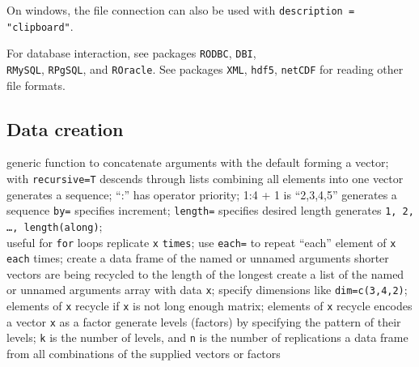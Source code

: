 On windows, the file connection can also be used with {\tt description =
"clipboard"}.


For database interaction, see packages {\tt RODBC}, {\tt DBI},\\
{\tt RMySQL}, {\tt RPgSQL}, and {\tt ROracle}. See packages {\tt XML},
{\tt hdf5}, {\tt netCDF} for reading other file formats.

\subsection{Data creation}{}
	{generic function to concatenate arguments with the default
forming a vector; with {\tt recursive=T} descends through lists combining all
elements into one vector}
	{generates a sequence; ``:'' has operator priority; 1:4 + 1 is
``2,3,4,5''}
	{generates a sequence {\tt by=} specifies increment; {\tt length=} specifies desired length}
	{generates {\tt 1, 2, \ldots, length(along)};\\useful for
{\tt for} loops}
	{replicate {\tt x} {\tt times}; use {\tt each=} to repeat ``each'' element of {\tt x} {\tt each} times;}
	{create a data frame of the named or unnamed arguments}
	{shorter vectors are being recycled to the length of the longest}
	{create a list of the named or unnamed arguments }
	{array with data {\tt x}; specify dimensions like {\tt dim=c(3,4,2)}; elements of {\tt x} recycle if {\tt x} is not long enough}
	{matrix; elements of {\tt x} recycle}
	{encodes a vector {\tt x} as a factor}
	{generate levels (factors) by specifying the pattern of their levels; {\tt k} is the number of levels, and {\tt n} is the number of replications}
	{a data frame from all combinations of the supplied vectors or factors}

